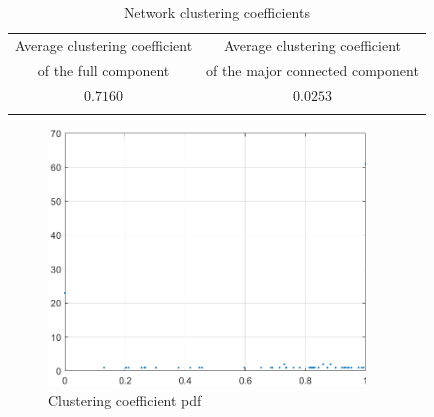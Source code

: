 \documentclass[12pt,a4paper]{article}
\begin{document}
\begin{table}[tb]
\centering
\begin{tabular}{c|c}
  \firsthline
  Average clustering coefficient & Average clustering coefficient\\
  of the full component &  of the major connected component\\
  \hline
$0.7160$ & $0.0253$\\
  \lasthline
\end{tabular}
\caption{Network clustering coefficients}
\label{tab:clust}
\end{table}

\begin{figure}
\centering
  \includegraphics[width = 0.75\textwidth]{img/ClusteringC}
\caption{Clustering coefficient pdf}
\label{fig:CC}
\end{figure}
\end{document}
